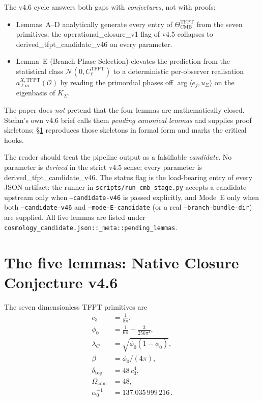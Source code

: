\documentclass[11pt,a4paper]{article}
\begin{document}
The v4.6 cycle answers both gaps with \emph{conjectures}, not with
proofs:

\begin{itemize}[leftmargin=1.4em]
\item Lemmas~A--D analytically generate every entry of
\(\Theta_{\mathrm{CMB}}^{\mathrm{TFPT}}\) from the seven primitives; the
\textsf{operational\_closure\_v1} flag of v4.5 collapses to
\textsf{derived\_tfpt\_candidate\_v46} on every parameter.
\item Lemma~E (Branch Phase Selection) elevates the prediction from
the statistical class \(\mathcal N(0,C_\ell^{\mathrm{TFPT}})\) to a
deterministic per-observer realisation
\(a_{\ell m}^{X,\mathrm{TFPT}}(\mathcal O)\) by reading the primordial
phases off \(\arg\langle e_j,u_\Sigma\rangle\) on the eigenbasis of
\(K_\Sigma\).
\end{itemize}

The paper does \emph{not} pretend that the four lemmas are
mathematically closed.  Stefan's own v4.6 brief calls them
\emph{pending canonical lemmas} and supplies proof skeletons;
\S\ref{sec:lemmas} reproduces those skeletons in formal form and marks
the critical hooks.

\begin{tfptwarningbox}
The reader should treat the pipeline output as a falsifiable
\emph{candidate}.  No parameter is \emph{derived} in the strict
v4.5 sense; every parameter is \textsf{derived\_tfpt\_candidate\_v46}.
The status flag is the load-bearing entry of every JSON artifact: the
runner in \texttt{scripts/run\_cmb\_stage.py} accepts a candidate
upstream only when \texttt{--candidate-v46} is passed explicitly, and
Mode~E only when both \texttt{--candidate-v46} and
\texttt{--mode-E-candidate} (or a real
\texttt{--branch-bundle-dir}) are supplied.  All five lemmas are
listed under \texttt{cosmology\_candidate.json::\_meta::pending\_lemmas}.
\end{tfptwarningbox}

\section{The five lemmas: Native Closure Conjecture v4.6}
\label{sec:lemmas}

The seven dimensionless TFPT primitives are
\begin{align}
c_3 &= \frac{1}{8\pi}, \\
\phi_0 &= \frac{1}{6\pi}+\frac{3}{256\pi^4}, \\
\lambda_C &= \sqrt{\phi_0(1-\phi_0)}, \\
\beta &= \phi_0/(4\pi), \\
\delta_{\mathrm{top}} &= 48\,c_3^4, \\
\Omega_{\mathrm{adm}} &= 48, \\
\alpha_0^{-1} &= 137.035\,999\,216 \,.
\end{align}
\end{document}
